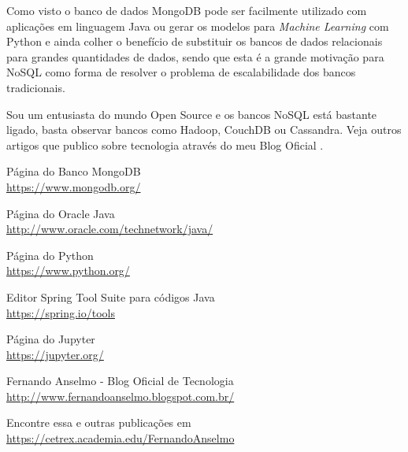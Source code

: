 \documentclass[a4paper,11pt]{article}
\begin{document}
Como visto o banco de dados MongoDB pode ser facilmente utilizado com aplicações em linguagem Java ou gerar os modelos para \textit{Machine Learning} com Python e ainda colher o benefício de substituir os bancos de dados relacionais para grandes quantidades de dados, sendo que esta é a grande motivação para NoSQL como forma de resolver o problema de escalabilidade dos bancos tradicionais.

Sou um entusiasta do mundo Open Source e os bancos NoSQL está bastante ligado, basta observar bancos como Hadoop, CouchDB ou Cassandra. Veja outros artigos que publico sobre tecnologia através do meu Blog Oficial \cite{fernandoanselmo}.


\begin{thebibliography}{7}

  Página do Banco MongoDB \\
  \url{https://www.mongodb.org/}

  Página do Oracle Java \\
  \url{http://www.oracle.com/technetwork/java/}
  
  Página do Python \\
  \url{https://www.python.org/}

  Editor Spring Tool Suite para códigos Java \\
  \url{https://spring.io/tools}

  Página do Jupyter \\
  \url{https://jupyter.org/}

  Fernando Anselmo - Blog Oficial de Tecnologia \\
  \url{http://www.fernandoanselmo.blogspot.com.br/}

  Encontre essa e outras publicações em \\
  \url{https://cetrex.academia.edu/FernandoAnselmo}
\end{thebibliography}
  
\end{document}
